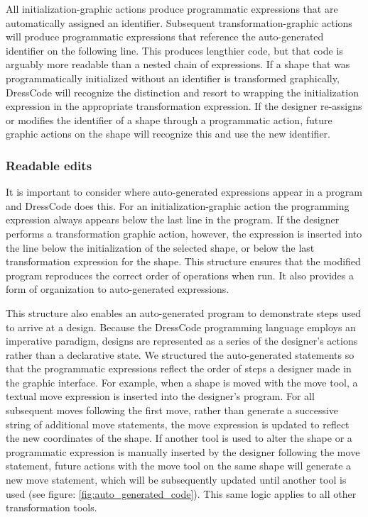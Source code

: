 \documentclass{sigchi}
\begin{document}
All initialization-graphic actions produce programmatic expressions that are automatically assigned an identifier. Subsequent transformation-graphic actions will produce programmatic expressions that reference the auto-generated identifier on the following line. This produces lengthier code, but that code is arguably more readable than a nested chain of expressions. If a shape that was programmatically initialized without an identifier is transformed graphically, DressCode will recognize the distinction and resort to wrapping the initialization expression in the appropriate transformation expression. If the designer re-assigns or modifies the identifier of a shape through a programmatic action, future graphic actions on the shape will recognize this and use the new identifier.

\subsubsection{Readable edits}
It is important to consider where auto-generated expressions appear in a program and DressCode does this. For an initialization-graphic action the programming expression always appears below the last line in the program. If the designer performs a transformation graphic action, however, the expression is inserted into the line below the initialization of the selected shape, or below the last transformation expression for the shape. This structure ensures that the modified program reproduces the correct order of operations when run. It also provides a form of organization to auto-generated expressions. 

This structure also enables an auto-generated program to demonstrate steps used to arrive at a design. Because the DressCode programming language employs an imperative paradigm, designs are represented as a series of the designer's actions rather than a declarative state. We structured the auto-generated statements so that the programmatic expressions reflect the order of steps a designer made in the graphic interface. For example, when a shape is moved with the move tool, a textual move expression is inserted into the designer's program. For all subsequent moves following the first move, rather than generate a successive string of additional move statements, the move expression is updated to reflect the new coordinates of the shape. If another tool is used to alter the shape or a programmatic expression is manually inserted by the designer following the move statement, future actions with the move tool on the same shape will generate a new move statement, which will be subsequently updated until another tool is used (see figure: \ref{fig:auto_generated_code}). This same logic applies to all other transformation tools.
\end{document}
